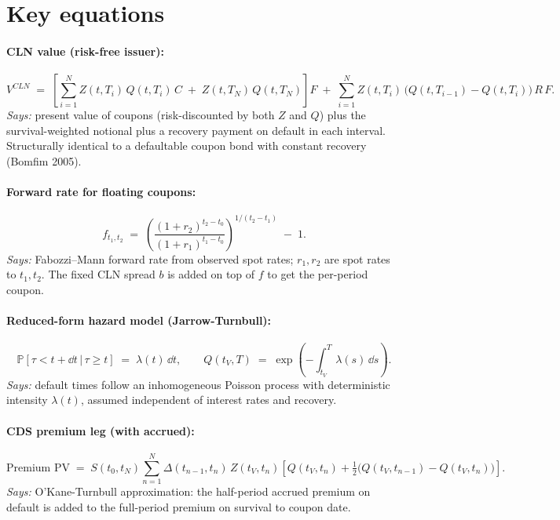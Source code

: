\documentclass[11pt,a4paper]{article}
\begin{document}
\section{Key equations}

\paragraph{CLN value (risk-free issuer):}
\begin{equation}\label{eq:cln-V}
  V^{CLN} \;=\; \left[ \sum_{i=1}^{N} Z(t, T_i)\, Q(t, T_i)\, C \;+\; Z(t, T_N)\, Q(t, T_N) \right] F
              \;+\; \sum_{i=1}^{N} Z(t, T_i)\, \bigl( Q(t, T_{i-1}) - Q(t, T_i) \bigr)\, R\, F.
\end{equation}
\textit{Says:} present value of coupons (risk-discounted by both $Z$
and $Q$) plus the survival-weighted notional plus a recovery payment
on default in each interval. Structurally identical to a defaultable
coupon bond with constant recovery (Bomfim 2005).

\paragraph{Forward rate for floating coupons:}
\begin{equation}\label{eq:cln-fwd}
  f_{t_1, t_2} \;=\; \left( \frac{(1 + r_2)^{t_2 - t_0}}{(1 + r_1)^{t_1 - t_0}} \right)^{\!\!1/(t_2 - t_1)} \;-\; 1.
\end{equation}
\textit{Says:} Fabozzi--Mann forward rate from observed spot rates;
$r_1, r_2$ are spot rates to $t_1, t_2$. The fixed CLN spread $b$ is
added on top of $f$ to get the per-period coupon.

\paragraph{Reduced-form hazard model (Jarrow-Turnbull):}
\begin{equation}\label{eq:cln-hazard}
  \mathbb{P}[\tau < t + \dd t \,|\, \tau \ge t] \;=\; \lambda(t)\, \dd t,
  \qquad
  Q(t_V, T) \;=\; \exp\!\left( -\int_{t_V}^T \lambda(s)\, \dd s \right).
\end{equation}
\textit{Says:} default times follow an inhomogeneous Poisson process
with deterministic intensity $\lambda(t)$, assumed independent of
interest rates and recovery.

\paragraph{CDS premium leg (with accrued):}
\begin{equation}\label{eq:cln-cds-prem}
  \text{Premium PV} \;=\; S(t_0, t_N) \sum_{n=1}^{N} \Delta(t_{n-1}, t_n)\, Z(t_V, t_n)\!
    \left[ Q(t_V, t_n) + \tfrac{1}{2}\bigl(Q(t_V, t_{n-1}) - Q(t_V, t_n)\bigr) \right].
\end{equation}
\textit{Says:} O'Kane-Turnbull approximation: the half-period accrued
premium on default is added to the full-period premium on survival
to coupon date.
\end{document}
